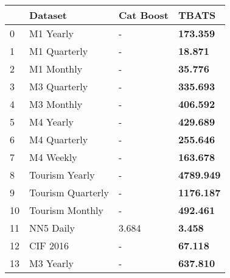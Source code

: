 \begin{tabular}{llll}
\toprule
 & Dataset & Cat Boost & TBATS \\
\midrule
0 & M1 Yearly & - & \textbf{173.359} \\
1 & M1 Quarterly & - & \textbf{18.871} \\
2 & M1 Monthly & - & \textbf{35.776} \\
3 & M3 Quarterly & - & \textbf{335.693} \\
4 & M3 Monthly & - & \textbf{406.592} \\
5 & M4 Yearly & - & \textbf{429.689} \\
6 & M4 Quarterly & - & \textbf{255.646} \\
7 & M4 Weekly & - & \textbf{163.678} \\
8 & Tourism Yearly & - & \textbf{4789.949} \\
9 & Tourism Quarterly & - & \textbf{1176.187} \\
10 & Tourism Monthly & - & \textbf{492.461} \\
11 & NN5 Daily & 3.684 & \textbf{3.458} \\
12 & CIF 2016 & - & \textbf{67.118} \\
13 & M3 Yearly & - & \textbf{637.810} \\
\bottomrule
\end{tabular}
